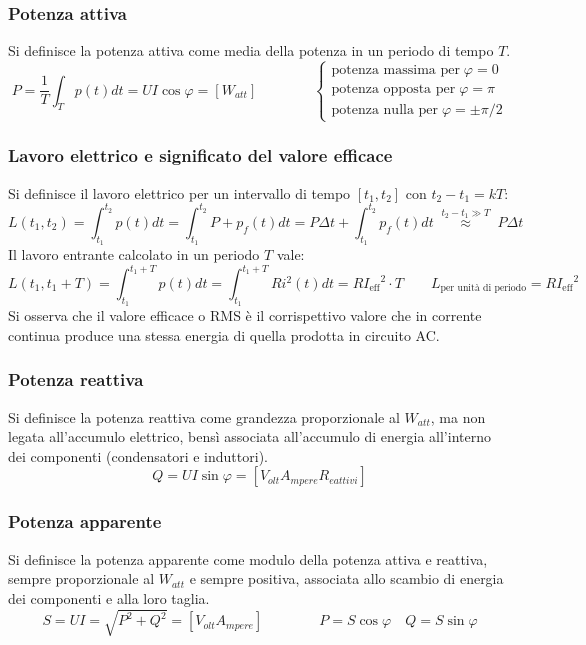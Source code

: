 \documentclass[a4paper]{article}
\begin{document}
\subsubsection*{Potenza attiva}
Si definisce la potenza attiva come media della potenza in un periodo di tempo \(T\).
\[P = \frac{1}{T} \int_T p(t) dt = UI \cos \varphi = [W_{att}] \qquad \qquad \begin{cases}
	\text{potenza massima per} \; \varphi = 0 \\
	\text{potenza opposta per} \; \varphi = \pi \\
	\text{potenza nulla per} \; \varphi = \pm\pi/2
\end{cases}\]

\subsubsection*{Lavoro elettrico e significato del valore efficace}
Si definisce il lavoro elettrico per un intervallo di tempo \([t_1, t_2]\) con \(t_2 - t_1 = k T\):
\[L(t_1,t_2) = \int_{t_1}^{t_2} p(t) dt = \int_{t_1}^{t_2} P + p_f(t) dt = P \Delta t + \int_{t_1}^{t_2} p_f(t) dt \; \stackrel{t_2-t_1 \gg T}{\approx} \; P \Delta t\]
Il lavoro entrante calcolato in un periodo \(T\) vale:
\[L(t_1, t_1 + T) = \int_{t_1}^{t_1+T} p(t) dt = \int_{t_1}^{t_1+T} R i^2(t) dt = R {I_\text{eff}}^2 \cdot T \qquad L_\text{per unità di periodo} = R{I_\text{eff}}^2\]
Si osserva che il valore efficace o RMS è il corrispettivo valore che in corrente continua produce una stessa energia di
quella prodotta in circuito AC.

\subsubsection*{Potenza reattiva}
Si definisce la potenza reattiva come grandezza proporzionale al \(W_{att}\), ma non legata all'accumulo elettrico, bensì associata
all'accumulo di energia all'interno dei componenti (condensatori e induttori).
\[Q = UI \sin \varphi = [V_{olt} A_{mpere} R_{eattivi}]\]

\subsubsection*{Potenza apparente}
Si definisce la potenza apparente come modulo della potenza attiva e reattiva, sempre proporzionale al \(W_{att}\) e sempre positiva,
associata allo scambio di energia dei componenti e alla loro taglia.
\[S = U I = \sqrt{P^2 + Q^2} = [V_{olt}A_{mpere}] \qquad\qquad P = S \cos \varphi \quad Q = S \sin \varphi\]
\end{document}
